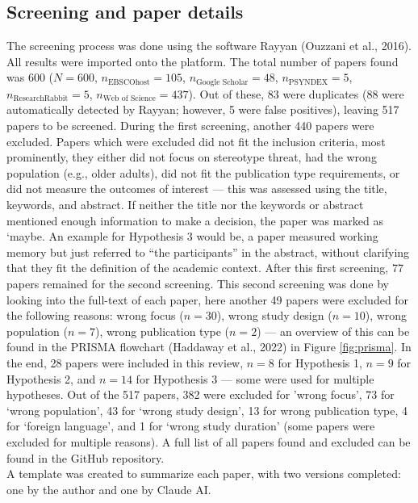 \documentclass[
  stu, a4paper,floatsintext]{apa7}
\begin{document}
\subsection{Screening and paper details}\label{screening-and-paper-details}

The screening process was done using the software Rayyan (Ouzzani et al., 2016). All results were imported onto the platform.
The total number of papers found was 600 (\(N = 600\), \(n_{\text{EBSCOhost}} = 105\), \(n_{\text{Google Scholar}} = 48\), \(n_{\text{PSYNDEX}} = 5\), \(n_{\text{ResearchRabbit}} = 5\), \(n_{\text{Web of Science}} = 437\)). Out of these, 83 were duplicates (88 were automatically detected by Rayyan; however, 5 were false positives), leaving 517 papers to be screened. During the first screening, another 440 papers were excluded.
Papers which were excluded did not fit the inclusion criteria, most prominently, they either did not focus on stereotype threat, had the wrong population (e.g., older adults), did not fit the publication type requirements, or did not measure the outcomes of interest --- this was assessed using the title, keywords, and abstract. If neither the title nor the keywords or abstract mentioned enough information to make a decision, the paper was marked as `maybe.
An example for Hypothesis 3 would be, a paper measured working memory but just referred to ``the participants'' in the abstract, without clarifying that they fit the definition of the academic context. After this first screening, 77 papers remained for the second screening.
This second screening was done by looking into the full-text of each paper, here another 49 papers were excluded for the following reasons: wrong focus (\(n = 30\)), wrong study design (\(n = 10\)), wrong population (\(n = 7\)), wrong publication type (\(n = 2\)) --- an overview of this can be found in the PRISMA flowchart (Haddaway et al., 2022) in Figure \ref{fig:prisma}.
In the end, 28 papers were included in this review, \(n = 8\) for Hypothesis 1, \(n = 9\) for Hypothesis 2, and \(n = 14\) for Hypothesis 3 --- some were used for multiple hypotheses. Out of the 517 papers, 382 were excluded for 'wrong focus', 73 for `wrong population', 43 for `wrong study design', 13 for wrong publication type, 4 for `foreign language', and 1 for `wrong study duration' (some papers were excluded for multiple reasons). A full list of all papers found and excluded can be found in the GitHub repository.\\
A template was created to summarize each paper, with two versions completed: one by the author and one by Claude AI.
\end{document}
